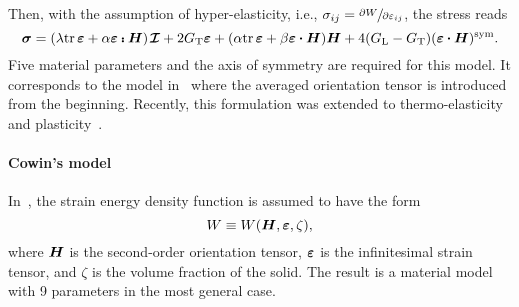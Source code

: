 	Then, with the assumption of hyper-elasticity, i.e., $\sigma_{ij}=\sfrac{\partial W}{\partial \varepsilon_{ij}}$, the stress reads
	\begin{equation}\label{eq:spen}
	\tenb{\sigma}=(\lambda\tr\tenb{\varepsilon}+\alpha\tenb{\varepsilon}\dscp\tenb{H})\unitd +2G_\text{T}\tenb{\varepsilon}+(\alpha\tr\tenb{\varepsilon}+\beta\tenb{\varepsilon}\scp\tenb{H})\tenb{H}+4(G_\text{L}-G_\text{T})(\tenb{\varepsilon}\scp\tenb{H})^\sym.
	\end{equation}
	Five material parameters and the axis of symmetry are required for this model. It corresponds to the model in~\parencite{Advani.1987} where the averaged orientation tensor is introduced from the beginning. Recently, this formulation was extended to thermo-elasticity~\parencite{Kehrer.2019} and plasticity~\parencite{Mehdipour.2019}.
	
	\paragraph{Cowin's model}In~\parencite{Cowin.1985}, the strain energy density function is assumed to have the form
	\begin{equation}
	W\equiv W(\tenb{H},\tenb{\varepsilon},\zeta),
	\end{equation}
	where $\tenb{H}$ is the second-order orientation tensor, $\tenb{\varepsilon}$ is the infinitesimal strain tensor, and $\zeta$ is the volume fraction of the solid. The result is a material model with 9 parameters in the most general case. 
	
	
